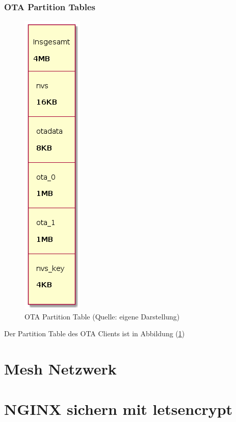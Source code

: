 \subsubsection{OTA Partition Tables}
\begin{figure}[H]
    \begin{center}
        \includegraphics[scale=0.7]{diagrams/ota_partition_table.png}
        \caption{OTA Partition Table (Quelle: eigene Darstellung)}
        \label{abb:ota_partition_table}
    \end{center}    
\end{figure}
Der Partition Table des OTA Clients ist in Abbildung (\ref{abb:ota_partition_table})



\section{Mesh Netzwerk}\label{sec:mesh}

\section{NGINX sichern mit letsencrypt}

